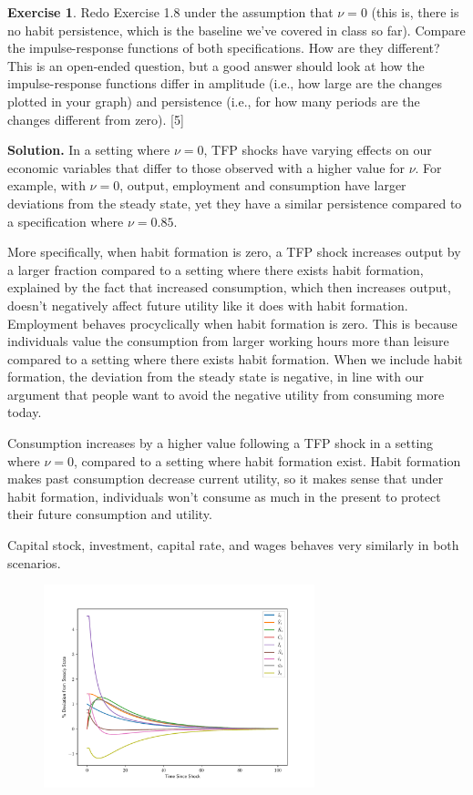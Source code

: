 \documentclass[11pt]{article}
\numberwithin{equation}{section} %
\numberwithin{figure}{section} %
\numberwithin{table}{section} %
\theoremstyle{definition}
\newtheorem{exercise}[theorem]{Exercise}
\newenvironment{solution}{\begin{addmargin}[2em]{0em} {\bf Solution. }}{\end{addmargin}}
\begin{document}
\begin{exercise}
    Redo Exercise 1.8 under the assumption that $\nu = 0$ (this is, there is no habit persistence, which is the baseline we've covered in class so far). Compare the impulse-response functions of both specifications. How are they different? This is an open-ended question, but a good answer should look at how the impulse-response functions differ in amplitude (i.e., how large are the changes plotted in your graph) and persistence (i.e., for how many periods are the changes different from zero). [5]
\end{exercise}

\begin{solution}
    In a setting where $\nu = 0$, TFP shocks have varying effects on our economic variables that differ to those observed with a higher value for $\nu$. For example, with $\nu = 0$, output, employment and consumption have larger deviations from the steady state, yet they have a similar persistence compared to a specification where $\nu = 0.85$. 
    
    More specifically, when habit formation is zero, a TFP shock increases output by a larger fraction compared to a setting where there exists habit formation, explained by the fact that increased consumption, which then increases output, doesn't negatively affect future utility like it does with habit formation.  
    Employment behaves procyclically when habit formation is zero. This is because individuals value the consumption from larger working hours more than leisure compared to a setting where there exists habit formation. When we include habit formation, the deviation from the steady state is negative, in line with our argument that people want to avoid the negative utility from consuming more today. 

    Consumption increases by a higher value following a TFP shock in a setting where $\nu = 0$, compared to a setting where habit formation exist. Habit formation makes past consumption decrease current utility, so it makes sense that under habit formation, individuals won't consume as much in the present to protect their future consumption and utility. 
    
    Capital stock, investment, capital rate, and wages behaves very similarly in both scenarios. 

    \begin{figure}[H]
        \centering
        \includegraphics[width=0.7\textwidth]{./graphs/nu=0.pdf}
    \end{figure}


\end{solution}
\end{document}
